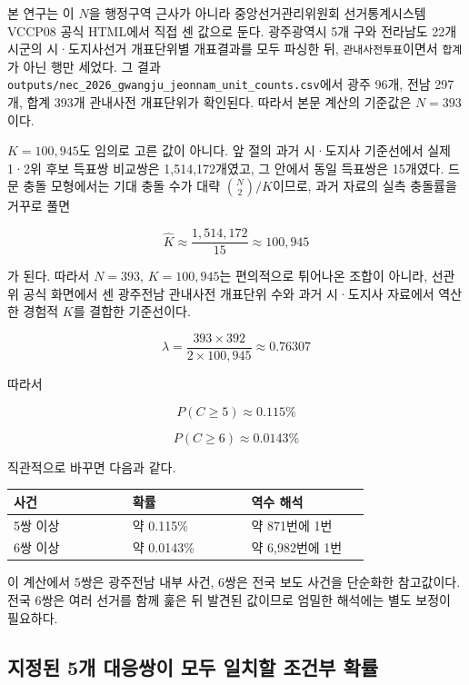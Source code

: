 \documentclass[preprint]{IEIE}
\begin{document}
본 연구는 이 \(N\)을 행정구역 근사가 아니라 중앙선거관리위원회 선거통계시스템 VCCP08 공식 HTML에서 직접 센 값으로 둔다. 광주광역시 5개 구와 전라남도 22개 시군의 시·도지사선거 개표단위별 개표결과를 모두 파싱한 뒤, \texttt{관내사전투표}이면서 \texttt{합계}가 아닌 행만 세었다. 그 결과 \texttt{outputs/nec\_2026\_gwangju\_jeonnam\_unit\_counts.csv}에서 광주 96개, 전남 297개, 합계 393개 관내사전 개표단위가 확인된다. 따라서 본문 계산의 기준값은 \(N=393\)이다.

\(K=100,945\)도 임의로 고른 값이 아니다. 앞 절의 과거 시·도지사 기준선에서 실제 1·2위 후보 득표쌍 비교쌍은 1,514,172개였고, 그 안에서 동일 득표쌍은 15개였다. 드문 충돌 모형에서는 기대 충돌 수가 대략 \(\binom{N}{2}/K\)이므로, 과거 자료의 실측 충돌률을 거꾸로 풀면

\[
\hat{K} \approx \frac{1,514,172}{15} \approx 100,945
\]

가 된다. 따라서 \(N=393\), \(K=100,945\)는 편의적으로 튀어나온 조합이 아니라, 선관위 공식 화면에서 센 광주전남 관내사전 개표단위 수와 과거 시·도지사 자료에서 역산한 경험적 \(K\)를 결합한 기준선이다.

\[
\lambda = \frac{393 \times 392}{2 \times 100,945} \approx 0.76307
\]

따라서

\[
P(C \geq 5) \approx 0.115\%
\]

\[
P(C \geq 6) \approx 0.0143\%
\]

직관적으로 바꾸면 다음과 같다.

\begin{center}
\scriptsize
\begin{tabular}{>{\raggedright\arraybackslash}p{0.293\linewidth}>{\raggedright\arraybackslash}p{0.293\linewidth}>{\raggedright\arraybackslash}p{0.293\linewidth}}
\toprule
사건 & 확률 & 역수 해석 \\
\midrule
5쌍 이상 & 약 0.115\% & 약 871번에 1번 \\
6쌍 이상 & 약 0.0143\% & 약 6,982번에 1번 \\
\bottomrule
\end{tabular}
\end{center}

이 계산에서 5쌍은 광주전남 내부 사건, 6쌍은 전국 보도 사건을 단순화한 참고값이다. 전국 6쌍은 여러 선거를 함께 훑은 뒤 발견된 값이므로 엄밀한 해석에는 별도 보정이 필요하다.

\subsection{지정된 5개 대응쌍이 모두 일치할 조건부 확률}
\end{document}
